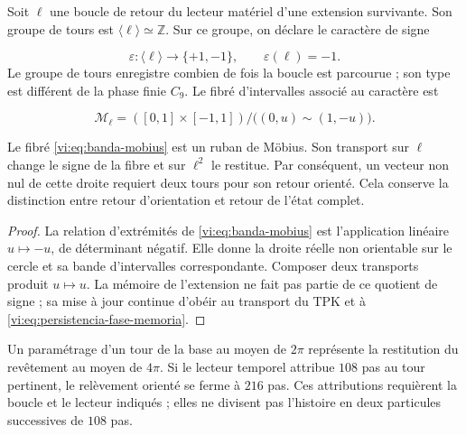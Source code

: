 Soit $\ell$ une boucle de retour du lecteur matériel d’une extension
survivante. Son groupe de tours est $\langle\ell\rangle\simeq
\mathbb Z$. Sur ce groupe, on déclare le caractère de signe

\begin{equation}
 \varepsilon:\langle\ell\rangle\longrightarrow\{+1,-1\},
 \qquad \varepsilon(\ell)=-1.
 \label{vi:eq:holonomia-signo}
\end{equation}
Le groupe de tours enregistre combien de fois la boucle est parcourue ; son
type est différent de la phase finie $C_9$. Le fibré d’intervalles
associé au caractère est

\begin{equation}
 \mathcal M_\ell=([0,1]\times[-1,1])/
                  \bigl((0,u)\sim(1,-u)\bigr).
 \label{vi:eq:banda-mobius}
\end{equation}

\begin{theorem}
\label{vi:thm:retorno-mobius}
Le fibré \eqref{vi:eq:banda-mobius} est un ruban de Möbius.
Son transport sur $\ell$ change le signe de la fibre et sur
$\ell^2$ le restitue. Par conséquent, un vecteur non nul de cette droite
requiert deux tours pour son retour orienté. Cela conserve la
distinction entre retour d’orientation et retour de l’état complet.

\end{theorem}
\begin{proof}
La relation d’extrémités de \eqref{vi:eq:banda-mobius} est l’application
linéaire $u\mapsto-u$, de déterminant négatif. Elle donne la droite réelle
non orientable sur le cercle et sa bande
d’intervalles correspondante. Composer deux transports produit $u\mapsto u$.
La mémoire de l’extension ne fait pas partie de ce quotient de signe ;
sa mise à jour continue d’obéir au transport du TPK et à
\eqref{vi:eq:persistencia-fase-memoria}.

\end{proof}

Un paramétrage d’un tour de la base au moyen de $2\pi$
représente la restitution du revêtement au moyen de $4\pi$. Si le
lecteur temporel attribue $108$ pas au tour pertinent, le
relèvement orienté se ferme à $216$ pas. Ces attributions
requièrent la boucle et le lecteur indiqués ; elles ne divisent pas l’histoire en
deux particules successives de $108$ pas.


